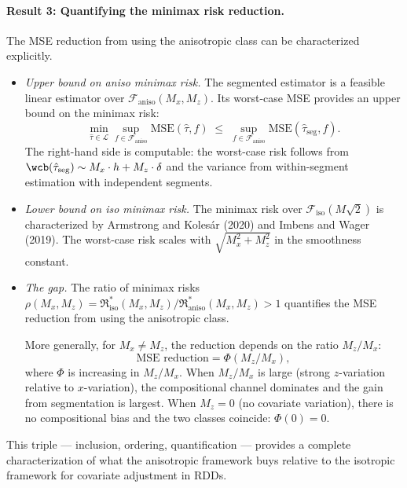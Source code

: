 \paragraph{Result 3: Quantifying the minimax risk reduction.}
The MSE reduction from using the anisotropic class can be characterized explicitly.
\begin{itemize}
	\item \emph{Upper bound on aniso minimax risk.}
	The segmented estimator is a feasible linear estimator over $\mathcal{F}_{\mathrm{aniso}}(M_x, M_z)$.
	Its worst-case MSE provides an upper bound on the minimax risk:
	\begin{equation*}
		\min_{\hat\tau \in \mathcal{L}} \sup_{f \in \mathcal{F}_{\mathrm{aniso}}} \mathrm{MSE}(\hat\tau, f) \;\leq\; \sup_{f \in \mathcal{F}_{\mathrm{aniso}}} \mathrm{MSE}(\hat\tau_{\mathrm{seg}}, f).
	\end{equation*}
	The right-hand side is computable: the worst-case risk follows from $\wcb(\hat\tau_{\mathrm{seg}}) \sim M_x \cdot h + M_z \cdot \delta$ and the variance from within-segment estimation with independent segments.

	\item \emph{Lower bound on iso minimax risk.}
	The minimax risk over $\mathcal{F}_{\mathrm{iso}}(M\sqrt{2})$ is characterized by Armstrong and Kolesár (2020) and Imbens and Wager (2019).
	The worst-case risk scales with $\sqrt{M_x^2 + M_z^2}$ in the smoothness constant.

	\item \emph{The gap.}
	The ratio of minimax risks $\rho(M_x, M_z) = \mathfrak{R}^*_{\mathrm{iso}}(M_x, M_z) / \mathfrak{R}^*_{\mathrm{aniso}}(M_x, M_z) > 1$ quantifies the MSE reduction from using the anisotropic class.

	More generally, for $M_x \neq M_z$, the reduction depends on the ratio $M_z / M_x$:
	\begin{equation*}
		\text{MSE reduction} = \Phi(M_z / M_x),
	\end{equation*}
	where $\Phi$ is increasing in $M_z / M_x$.
	When $M_z / M_x$ is large (strong $z$-variation relative to $x$-variation), the compositional channel dominates and the gain from segmentation is largest.
	When $M_z = 0$ (no covariate variation), there is no compositional bias and the two classes coincide: $\Phi(0) = 0$.
\end{itemize}

This triple --- inclusion, ordering, quantification --- provides a complete characterization of what the anisotropic framework buys relative to the isotropic framework for covariate adjustment in RDDs.


